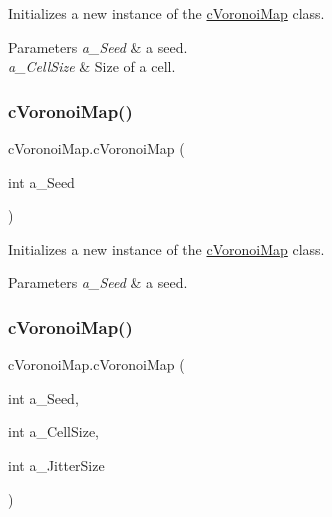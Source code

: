 Initializes a new instance of the \hyperlink{classc_voronoi_map}{c\+Voronoi\+Map} class. 


\begin{DoxyParams}{Parameters}
{\em a\+\_\+\+Seed} & a seed.\\
\hline
{\em a\+\_\+\+Cell\+Size} & Size of a cell.\\
\hline
\end{DoxyParams}
\mbox{\label{classc_voronoi_map_a809169452b3942fcf3f2716b0a215c78}} 
\subsubsection{\texorpdfstring{c\+Voronoi\+Map()}{cVoronoiMap()}\hspace{0.1cm}{\footnotesize\ttfamily [2/3]}}
{\footnotesize\ttfamily c\+Voronoi\+Map.\+c\+Voronoi\+Map (\begin{DoxyParamCaption}\item[{int}]{a\+\_\+\+Seed }\end{DoxyParamCaption})\hspace{0.3cm}{\ttfamily [inline]}}



Initializes a new instance of the \hyperlink{classc_voronoi_map}{c\+Voronoi\+Map} class. 


\begin{DoxyParams}{Parameters}
{\em a\+\_\+\+Seed} & a seed.\\
\hline
\end{DoxyParams}
\mbox{\label{classc_voronoi_map_a9be89da217e8252b90de1e11407ea467}} 
\subsubsection{\texorpdfstring{c\+Voronoi\+Map()}{cVoronoiMap()}\hspace{0.1cm}{\footnotesize\ttfamily [3/3]}}
{\footnotesize\ttfamily c\+Voronoi\+Map.\+c\+Voronoi\+Map (\begin{DoxyParamCaption}\item[{int}]{a\+\_\+\+Seed,  }\item[{int}]{a\+\_\+\+Cell\+Size,  }\item[{int}]{a\+\_\+\+Jitter\+Size }\end{DoxyParamCaption})\hspace{0.3cm}{\ttfamily [inline]}}



